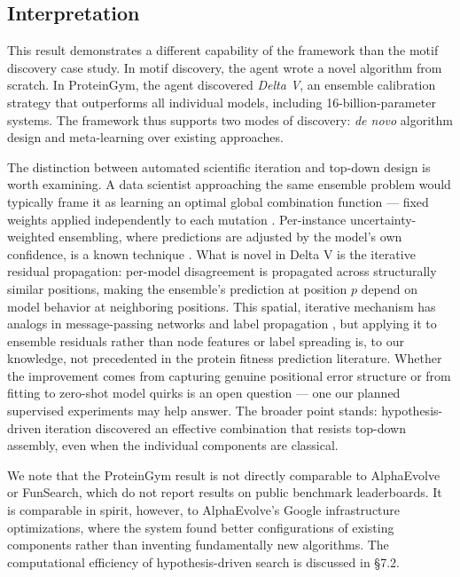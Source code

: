 \documentclass[11pt,a4paper]{article}
\begin{document}
\subsection{Interpretation}

This result demonstrates a different capability of the framework than the motif discovery case study. In motif discovery, the agent wrote a novel algorithm from scratch. In ProteinGym, the agent discovered \emph{Delta V}, an ensemble calibration strategy that outperforms all individual models, including 16-billion-parameter systems. The framework thus supports two modes of discovery: \emph{de novo} algorithm design and meta-learning over existing approaches.

The distinction between automated scientific iteration and top-down design is worth examining. A data scientist approaching the same ensemble problem would typically frame it as learning an optimal global combination function --- fixed weights applied independently to each mutation \citep{zhang2024modify}. Per-instance uncertainty-weighted ensembling, where predictions are adjusted by the model's own confidence, is a known technique \citep{lakshminarayanan2017simple, kwon2024dune}. What is novel in Delta V is the iterative residual propagation: per-model disagreement is propagated across structurally similar positions, making the ensemble's prediction at position $p$ depend on model behavior at neighboring positions. This spatial, iterative mechanism has analogs in message-passing networks \citep{gilmer2017neural} and label propagation \citep{zhu2002semi}, but applying it to ensemble residuals rather than node features or label spreading is, to our knowledge, not precedented in the protein fitness prediction literature. Whether the improvement comes from capturing genuine positional error structure or from fitting to zero-shot model quirks is an open question --- one our planned supervised experiments may help answer. The broader point stands: hypothesis-driven iteration discovered an effective combination that resists top-down assembly, even when the individual components are classical.

We note that the ProteinGym result is not directly comparable to AlphaEvolve or FunSearch, which do not report results on public benchmark leaderboards. It is comparable in spirit, however, to AlphaEvolve's Google infrastructure optimizations, where the system found better configurations of existing components rather than inventing fundamentally new algorithms. The computational efficiency of hypothesis-driven search is discussed in \S7.2.
\end{document}

